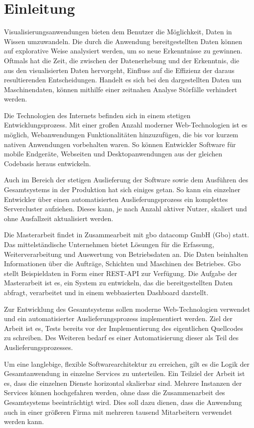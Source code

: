 \chapter{Einleitung}
\label{chap:einleitung}
Visualisierungsanwendungen bieten dem Benutzer die Möglichkeit,
Daten in Wissen umzuwandeln. Die durch die Anwendung bereitgestellten
Daten können auf explorative Weise analysiert werden, um so neue
Erkenntnisse zu gewinnen. Oftmals hat die Zeit, die zwischen der 
Datenerhebung und der Erkenntnis, die aus den visualisierten Daten hervorgeht,
Einfluss auf die Effizienz der daraus resultierenden Entscheidungen.
Handelt es sich bei den dargestellten Daten um Maschinendaten,
können mithilfe einer zeitnahen Analyse Störfälle verhindert werden.

Die Technologien des Internets befinden sich in einem stetigen Entwicklungsprozess.
Mit einer großen Anzahl moderner Web-Technologien ist es möglich, Webanwendungen Funktionalitäten
hinzuzufügen, die bis vor kurzem nativen Anwendungen vorbehalten waren. So können Entwickler
Software für mobile Endgeräte, Webseiten und Desktopanwendungen aus der gleichen Codebasis
heraus entwickeln.

Auch im Bereich der stetigen Auslieferung der Software sowie dem Ausführen des Gesamtsystems in der 
Produktion hat sich einiges getan. So kann ein einzelner Entwickler über einen automatisierten 
Auslieferungsprozess ein komplettes Servercluster aufziehen. Dieses kann, je nach Anzahl aktiver Nutzer, skaliert
und ohne Ausfallzeit aktualisiert werden.

Die Masterarbeit findet in Zusammearbeit mit gbo datacomp GmbH (Gbo) statt.
Das mittelständische Unternehmen bietet Lösungen für die Erfassung,
Weiterverarbeitung und Auswertung von Betriebsdaten an. Die Daten
beinhalten Informationen über die Aufträge, Schichten und Maschinen
des Betriebes. Gbo stellt Beispieldaten in Form einer REST-API
zur Verfügung. Die Aufgabe der Masterarbeit ist es, ein System zu entwickeln,
das die bereitgestellten Daten abfragt, verarbeitet und in einem webbasierten
Dashboard darstellt.

Zur Entwicklung des Gesamtsystems sollen moderne Web-Technologien verwendet
und ein automatisierter Auslieferungsprozess implementiert werden. Ziel der Arbeit ist es,
Tests bereits vor der Implementierung des eigentlichen Quellcodes zu schreiben. Des Weiteren 
bedarf es einer Automatisierung dieser als Teil des Auslieferungsprozesses. 

Um eine langlebige, flexible Softwarearchitektur zu erreichen, gilt es die Logik
der Gesamtanwendung in einzelne Services zu unterteilen. Ein Teilziel der Arbeit
ist es, dass die einzelnen Dienste horizontal skalierbar sind. Mehrere Instanzen
der Services können hochgefahren werden, ohne dass die Zusammenarbeit
des Gesamtsystems beeinträchtigt wird. Dies soll dazu dienen, dass die Anwendung
auch in einer größeren Firma mit mehreren tausend Mitarbeitern verwendet werden kann.

